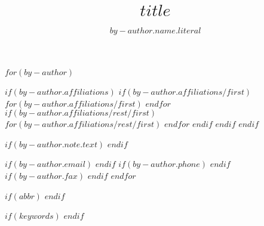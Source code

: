 $for(by-author)$
\author{$by-author.name.literal$}
$if(by-author.affiliations)$
$if(by-author.affiliations/first)$
$for(by-author.affiliations/first)$
$endfor$
$if(by-author.affiliations/rest/first)$
$for(by-author.affiliations/rest/first)$
$endfor$
$endif$
$endif$
$endif$

$if(by-author.note.text)$
$endif$

$if(by-author.email)$
$endif$
$if(by-author.phone)$
$endif$
$if(by-author.fax)$
$endif$
$endfor$

$if(abbr)$
$endif$

$if(keywords)$
$endif$

\title[$title-short$]{$title$}
\makeatletter